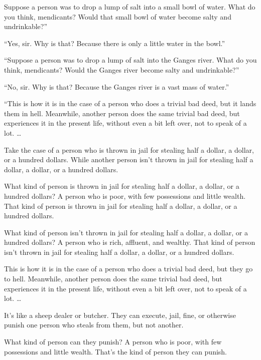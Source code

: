 \documentclass[12pt,openany]{book}%
\begin{document}
Suppose a person was to drop a lump of salt into a small bowl of water. What do you think, mendicants? Would that small bowl of water become salty and undrinkable?” 

“Yes, sir. Why is that? Because there is only a little water in the bowl.” 

“Suppose a person was to drop a lump of salt into the Ganges river. What do you think, mendicants? Would the Ganges river become salty and undrinkable?” 

“No, sir. Why is that? Because the Ganges river is a vast mass of water.” 

“This is how it is in the case of a person who does a trivial bad deed, but it lands them in hell. Meanwhile, another person does the same trivial bad deed, but experiences it in the present life, without even a bit left over, not to speak of a lot. … 

Take the case of a person who is thrown in jail for stealing half a dollar, a dollar, or a hundred dollars. While another person isn’t thrown in jail for stealing half a dollar, a dollar, or a hundred dollars. 

What kind of person is thrown in jail for stealing half a dollar, a dollar, or a hundred dollars? A person who is poor, with few possessions and little wealth. That kind of person is thrown in jail for stealing half a dollar, a dollar, or a hundred dollars. 

What kind of person isn’t thrown in jail for stealing half a dollar, a dollar, or a hundred dollars? A person who is rich, affluent, and wealthy. That kind of person isn’t thrown in jail for stealing half a dollar, a dollar, or a hundred dollars. 

This is how it is in the case of a person who does a trivial bad deed, but they go to hell. Meanwhile, another person does the same trivial bad deed, but experiences it in the present life, without even a bit left over, not to speak of a lot. … 

It’s like a sheep dealer or butcher. They can execute, jail, fine, or otherwise punish one person who steals from them, but not another. 

What kind of person can they punish? A person who is poor, with few possessions and little wealth. That’s the kind of person they can punish. 
\end{document}
